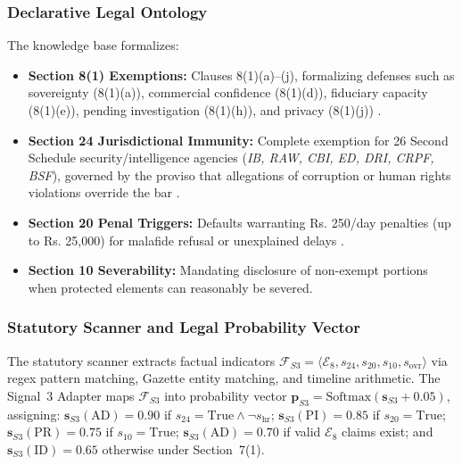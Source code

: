 \documentclass[conference]{IEEEtran}
\begin{document}
\subsubsection{Declarative Legal Ontology}
The knowledge base formalizes:
\begin{itemize}
    \setlength{\itemsep}{1pt}\setlength{\parskip}{0pt}\setlength{\parsep}{0pt}
    \item \textbf{Section 8(1) Exemptions:} Clauses 8(1)(a)--(j), formalizing defenses such as sovereignty (8(1)(a)), commercial confidence (8(1)(d)), fiduciary capacity (8(1)(e)), pending investigation (8(1)(h)), and privacy (8(1)(j)) \cite{deshpande2013, aditya2011}.
    \item \textbf{Section 24 Jurisdictional Immunity:} Complete exemption for 26 Second Schedule security/intelligence agencies (\textit{IB, RAW, CBI, ED, DRI, CRPF, BSF}), governed by the proviso that allegations of corruption or human rights violations override the bar \cite{sudhirkumar2009}.
    \item \textbf{Section 20 Penal Triggers:} Defaults warranting Rs. 250/day penalties (up to Rs. 25,000) for malafide refusal or unexplained delays \cite{bhamburkar2013}.
    \item \textbf{Section 10 Severability:} Mandating disclosure of non-exempt portions when protected elements can reasonably be severed.
\end{itemize}

\subsubsection{Statutory Scanner and Legal Probability Vector}
The statutory scanner extracts factual indicators $\mathcal{F}_{S3} = \langle \mathcal{E}_8, s_{24}, s_{20}, s_{10}, s_{\text{ovr}} \rangle$ via regex pattern matching, Gazette entity matching, and timeline arithmetic. The Signal~3 Adapter maps $\mathcal{F}_{S3}$ into probability vector $\mathbf{p}_{S3} = \text{Softmax}(\mathbf{s}_{S3} + 0.05)$, assigning: $\mathbf{s}_{S3}(\text{AD})=0.90$ if $s_{24}=\text{True} \land \neg s_{\text{hr}}$; $\mathbf{s}_{S3}(\text{PI})=0.85$ if $s_{20}=\text{True}$; $\mathbf{s}_{S3}(\text{PR})=0.75$ if $s_{10}=\text{True}$; $\mathbf{s}_{S3}(\text{AD})=0.70$ if valid $\mathcal{E}_8$ claims exist; and $\mathbf{s}_{S3}(\text{ID})=0.65$ otherwise under Section~7(1).
\end{document}
